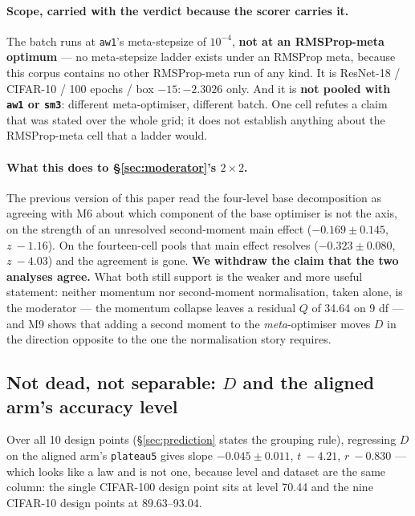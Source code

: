 \documentclass[10pt,letterpaper]{article}
\newcommand{\Dstat}{D}                         %
\newcommand{\plateau}{\texttt{plateau5}}
\newcommand{\arm}[1]{\texttt{#1}}
\begin{document}
\paragraph{Scope, carried with the verdict because the scorer carries it.}
The batch runs at \arm{aw1}'s meta-stepsize of $10^{-4}$, \textbf{not at an RMSProp-meta optimum}
--- no meta-stepsize ladder exists under an RMSProp meta, because this corpus contains no other
RMSProp-meta run of any kind. It is ResNet-18 / CIFAR-10 / 100 epochs / box $-15{:}{-}2.3026$
only. And it is \textbf{not pooled with \arm{aw1} or \arm{sm3}}: different meta-optimiser,
different batch. One cell refutes a claim that was stated over the whole grid; it does not
establish anything about the RMSProp-meta cell that a ladder would.

\paragraph{What this does to \S\ref{sec:moderator}'s $2 \times 2$.}
The previous version of this paper read the four-level base decomposition as agreeing with M6 about which
component of the base optimiser is not the axis, on the strength of an unresolved second-moment
main effect ($-0.169 \pm 0.145$, $z\ -1.16$). On the fourteen-cell pools that main effect resolves
($-0.323 \pm 0.080$, $z\ -4.03$) and the agreement is gone. \textbf{We withdraw the claim that the
two analyses agree.} What both still support is the weaker and more useful statement: neither
momentum nor second-moment normalisation, taken alone, is the moderator --- the momentum collapse
leaves a residual $Q$ of 34.64 on 9 df --- and M9 shows that adding a second moment to the
\emph{meta}-optimiser moves $\Dstat$ in the direction opposite to the one the normalisation story
requires.

\subsection{Not dead, not separable: \texorpdfstring{$\Dstat$}{D} and the aligned arm's accuracy
level}
\label{sec:level}

Over all 10 design points (\S\ref{sec:prediction} states the grouping rule), regressing $\Dstat$
on the aligned arm's \plateau{} gives slope $\mathbf{-0.045 \pm 0.011}$, $t\ -4.21$, $r\ -0.830$
--- which looks like a law and is not one, because level and dataset are the same column: the
single CIFAR-100 design point sits at level 70.44 and the nine CIFAR-10 design points at
89.63--93.04.
\end{document}
